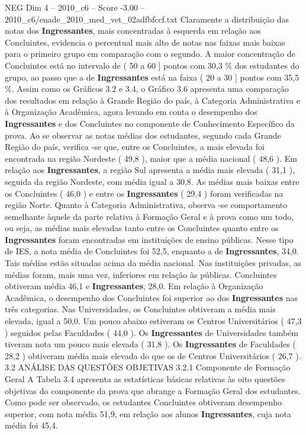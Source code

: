 \begin{textsample}{NEG Dim 4 – 2010\_c6 – Score -3.00 – 2010\_c6/enade\_2010\_med\_vet\_02adfbfccf.txt}
Claramente a distribuição das notas dos \textbf{Ingressantes}, mais concentradas à esquerda em relação aos Concluintes, evidencia o percentual mais alto de notas nas faixas mais baixas para o primeiro grupo em comparação com o segundo.
A maior concentração de Concluintes está no intervalo de ( 50 a 60 ] pontos com 30,3 \% dos estudantes do grupo, ao passo que a de \textbf{Ingressantes} está na faixa ( 20 a 30 ] pontos com 35,5 \%.
Assim como os Gráficos 3.2 e 3.4, o Gráfico 3.6 apresenta uma comparação dos resultados em relação à Grande Região do país, à Categoria Administrativa e à Organização Acadêmica, agora levando em conta o desempenho dos \textbf{Ingressantes} e dos Concluintes no componente de Conhecimento Específico da prova.
Ao se observar as notas médias dos estudantes, segundo cada Grande Região do país, verifica -se que, entre os Concluintes, a mais elevada foi encontrada na região Nordeste ( 49,8 ), maior que a média nacional ( 48,6 ).
Em relação aos \textbf{Ingressantes}, a região Sul apresenta a média mais elevada ( 31,1 ), seguida da região Nordeste, com média igual a 30,8.
As médias mais baixas entre os Concluintes ( 46,0 ) e entre os \textbf{Ingressantes} ( 29,4 ) foram verificadas na região Norte.
Quanto à Categoria Administrativa, observa -se comportamento semelhante àquele da parte relativa à Formação Geral e à prova como um todo, ou seja, as médias mais elevadas tanto entre os Concluintes quanto entre os \textbf{Ingressantes} foram encontradas em instituições de ensino públicas.
Nesse tipo de IES, a nota média de Concluintes foi 52,5, enquanto a de \textbf{Ingressantes}, 34,0.
Tais médias estão situadas acima da média nacional.
Nas instituições privadas, as médias foram, mais uma vez, inferiores em relação às públicas.
Concluintes obtiveram média 46,1 e \textbf{Ingressantes}, 28,0.
Em relação à Organização Acadêmica, o desempenho dos Concluintes foi superior ao dos \textbf{Ingressantes} nas três categorias.
Nas Universidades, os Concluintes obtiveram a média mais elevada, igual a 50,0.
Um pouco abaixo estiveram os Centros Universitários ( 47,3 ) seguidos pelas Faculdades ( 44,0 ).
Os \textbf{Ingressantes} de Universidades também tiveram nota um pouco mais elevada ( 31,8 ).
Os \textbf{Ingressantes} de Faculdades ( 28,2 ) obtiveram média mais elevada do que os de Centros Universitários ( 26,7 ). 3.2 ANÁLISE DAS QUESTÕES OBJETIVAS 3.2.1 Componente de Formação Geral A Tabela 3.4 apresenta as estatísticas básicas relativas às oito questões objetivas do componente da prova que abrange a Formação Geral dos estudantes.
Como pode ser observado, os estudantes Concluintes obtiveram desempenho superior, com nota média 51,9, em relação aos alunos \textbf{Ingressantes}, cuja nota média foi 45,4.

\end{textsample}
